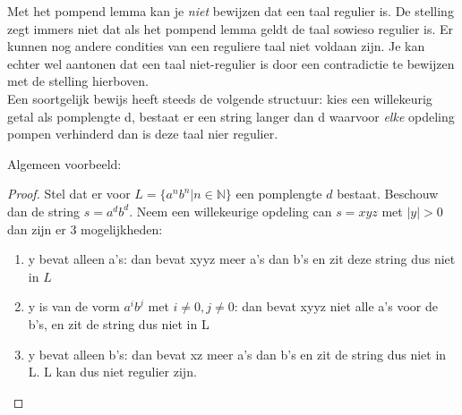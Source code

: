 Met het pompend lemma kan je \emph{niet} bewijzen dat een taal regulier is. De stelling zegt immers niet dat als het pompend lemma geldt de taal sowieso regulier is. Er kunnen nog andere condities van een reguliere taal niet voldaan zijn.
Je kan echter wel aantonen dat een taal niet-regulier is door een contradictie te bewijzen met de stelling hierboven.\\
Een soortgelijk bewijs heeft steeds de volgende structuur: kies een willekeurig getal als pomplengte d, bestaat er een string langer dan d waarvoor \emph{elke} opdeling pompen verhinderd dan is deze taal nier regulier.

Algemeen voorbeeld:
\begin{proof}
Stel dat er voor $L= \{a^nb^n | n \in \mathbb{N}\}$ een pomplengte $d$ bestaat. Beschouw dan de string $s=a^db^d$. Neem een willekeurige opdeling can $s=xyz$ met $|y| > 0$ dan zijn er 3 mogelijkheden:
\begin{enumerate}
\item y bevat alleen a's: dan bevat xyyz meer a's dan b's en zit deze string dus niet in $L$
\item y is van de vorm $a^ib^j$ met $i \neq 0, j \neq 0$: dan bevat xyyz niet alle a's voor de b's, en zit de string dus niet in L
\item y bevat alleen b's: dan bevat xz meer a's dan b's en zit de string dus niet in L. L kan dus niet regulier zijn.
\end{enumerate}
\end{proof}
